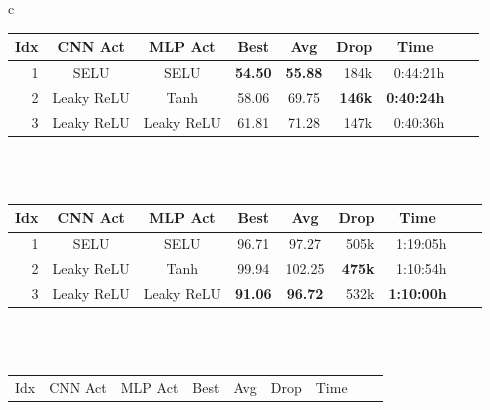 \begin{table}[ht]
    \begin{center}
        \begin{tabular}{c}
            \begin{tabular}{rccccrrrr}
                \toprule
                \multicolumn{1}{c}{Idx} & \multicolumn{1}{c}{CNN Act} & \multicolumn{1}{c}{MLP Act} & \multicolumn{1}{c}{Best} & \multicolumn{1}{c}{Avg} & \multicolumn{1}{c}{Drop} & \multicolumn{1}{c}{Time}\\
                \midrule
                1 & SELU & SELU & \textbf{54.50} & \textbf{55.88} & 184k & 0:44:21h \\
                2 & Leaky ReLU & Tanh & 58.06 & 69.75 & \textbf{146k} & \textbf{0:40:24h} \\
                3 & Leaky ReLU & Leaky ReLU & 61.81 & 71.28 & 147k & 0:40:36h \\
                \bottomrule
            \end{tabular} \\
             \\
            \addlinespace[0.5cm]
            \begin{tabular}{rccccrrrr}
                \toprule
                \multicolumn{1}{c}{Idx} & \multicolumn{1}{c}{CNN Act} & \multicolumn{1}{c}{MLP Act} & \multicolumn{1}{c}{Best} & \multicolumn{1}{c}{Avg} & \multicolumn{1}{c}{Drop} & \multicolumn{1}{c}{Time}\\
                \midrule
                1 & SELU & SELU & 96.71 & 97.27 & 505k & 1:19:05h \\
                2 & Leaky ReLU & Tanh & 99.94 & 102.25 & \textbf{475k} & 1:10:54h \\
                3 & Leaky ReLU & Leaky ReLU & \textbf{91.06} & \textbf{96.72} & 532k & \textbf{1:10:00h} \\
                \bottomrule
            \end{tabular} \\
             \\
            \addlinespace[0.5cm]
            \begin{tabular}{rccccrrrr}
                \toprule
                \multicolumn{1}{c}{Idx} & \multicolumn{1}{c}{CNN Act} & \multicolumn{1}{c}{MLP Act} & \multicolumn{1}{c}{Best} & \multicolumn{1}{c}{Avg} & \multicolumn{1}{c}{Drop} & \multicolumn{1}{c}{Time}\\

\end{tabular}
\end{tabular}
\end{center}
\end{table}
